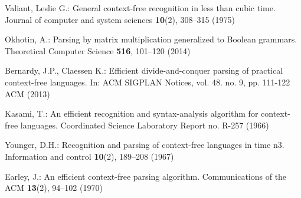 \documentclass[runningheads]{llncs}
\begin{document}
%
%
%
% 
% 
%
\begin{thebibliography}{8}
Valiant, Leslie G.: General context-free recognition in less than cubic time. Journal of computer and system sciences \textbf{10}(2), 308--315 (1975)

Okhotin, A.: Parsing by matrix multiplication generalized to Boolean grammars. Theoretical Computer Science \textbf{516}, 101--120 (2014)

Bernardy, J.P., Claessen K.: Efficient divide-and-conquer parsing of practical context-free languages. In: ACM SIGPLAN Notices, vol. 48. no. 9, pp. 111-122 ACM (2013)

Kasami, T.: An efficient recognition and syntax-analysis algorithm for context-free languages. Coordinated Science Laboratory Report no. R-257 (1966)

Younger, D.H.: Recognition and parsing of context-free languages in time n3. Information and control \textbf{10}(2), 189--208 (1967)

Earley, J.: An efficient context-free parsing algorithm. Communications of the ACM \textbf{13}(2), 94--102 (1970)

\end{thebibliography}
\end{document}

